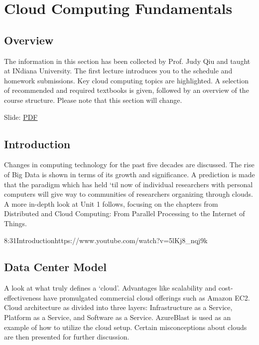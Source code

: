 \chapter{Cloud Computing Fundamentals}


\section{Overview}


The information in this section has been collected by Prof. Judy Qiu
and taught at INdiana University. The first lecture introduces you to the
schedule and homework submissions. Key cloud computing topics are
highlighted. A selection of recommended and required textbooks is given,
followed by an overview of the course structure. Please note that this
section will change.


  Slide:
  \href{https://drive.google.com/open?id=0B88HKpainTSfYjU4QzdDSms0Nk0}{PDF}

\section{Introduction}

Changes in computing technology for the past five decades are discussed.
The rise of Big Data is shown in terms of its growth and significance. A
prediction is made that the paradigm which has held `til now of
individual researchers with personal computers will give way to
communities of researchers organizing through clouds. A more in-depth
look at Unit 1 follows, focusing on the chapters from Distributed and
Cloud Computing: From Parallel Processing to the Internet of Things.

  {8:31}{Introduction}{https://www.youtube.com/watch?v=5lKj8_nqj9k}


\section{Data Center Model}

A look at what truly defines a `cloud'. Advantages like scalability and
cost-effectiveness have promulgated commercial cloud offerings such as
Amazon EC2. Cloud architecture as divided into three layers:
Infrastructure as a Service, Platform as a Service, and Software as a
Service. AzureBlast is used as an example of how to utilize the cloud
setup. Certain misconceptions about clouds are then presented for
further discussion.

